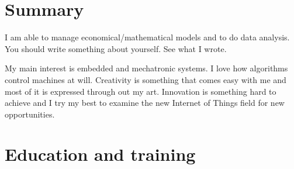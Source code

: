 \documentclass[letterpaper]{engineer_cv} %
\begin{document}
	\makeprofile %


	\section{Summary}

    I am able to manage economical/mathematical models and to do data analysis. You should write something about yourself. See what I wrote.

	My main interest is embedded and mechatronic systems. I love how algorithms control machines at will. Creativity is something that comes easy with me and most of it is expressed through out my art. Innovation is something hard to achieve and I try my best to examine the new Internet of Things field for new opportunities.


	\section{Education and training}
\end{document}
